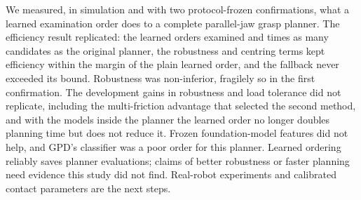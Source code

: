We measured, in simulation and with two protocol-frozen confirmations, what a learned examination order does to a complete parallel-jaw grasp planner. The efficiency result replicated: the learned orders examined \confPoneRatio{} and \nxConeEff{} times as many candidates as the original planner, the robustness and centring terms kept efficiency within the margin of the plain learned order, and the fallback never exceeded its bound. Robustness was non-inferior, fragilely so in the first confirmation. The development gains in robustness and load tolerance did not replicate, including the multi-friction advantage that selected the second method, and with the models inside the planner the learned order no longer doubles planning time but does not reduce it. Frozen foundation-model features did not help, and GPD's classifier was a poor order for this planner. Learned ordering reliably saves planner evaluations; claims of better robustness or faster planning need evidence this study did not find. Real-robot experiments and calibrated contact parameters are the next steps.
